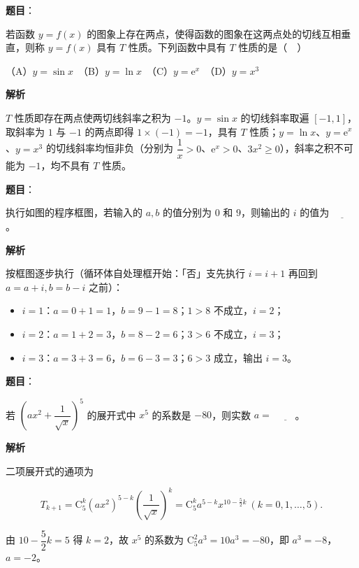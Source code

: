 \begin{answer}

\textbf{题目}：

若函数 \(y=f(x)\) 的图象上存在两点，使得函数的图象在这两点处的切线互相垂直，则称 \(y=f(x)\) 具有 \(T\) 性质。下列函数中具有 \(T\) 性质的是（　）

（A）\(y=\sin x\)　（B）\(y=\ln x\)　（C）\(y=\mathrm{e}^{x}\)　（D）\(y=x^{3}\)

\textbf{解析}

\(T\) 性质即存在两点使两切线斜率之积为 \(-1\)。\(y=\sin x\) 的切线斜率取遍 \([-1,1]\)，取斜率为 \(1\) 与 \(-1\) 的两点即得 \(1\times(-1)=-1\)，具有 \(T\) 性质；\(y=\ln x\)、\(y=\mathrm{e}^{x}\)、\(y=x^{3}\) 的切线斜率均恒非负（分别为 \(\dfrac{1}{x}>0\)、\(\mathrm{e}^{x}>0\)、\(3x^{2}\geqslant 0\)），斜率之积不可能为 \(-1\)，均不具有 \(T\) 性质。


\end{answer}
\begin{answer}

\textbf{题目}：

执行如图的程序框图，若输入的 \(a,b\) 的值分别为 \(0\) 和 \(9\)，则输出的 \(i\) 的值为 \(\underline{\qquad}\)。
\nopagebreak[4]
\begin{center}\end{center}
\nopagebreak[4]
\textbf{解析}

按框图逐步执行（循环体自处理框开始：「否」支先执行 \(i=i+1\) 再回到 \(a=a+i,b=b-i\) 之前）：

\begin{itemize}
\item \(i=1\)：\(a=0+1=1\)，\(b=9-1=8\)；\(1>8\) 不成立，\(i=2\)；
\item \(i=2\)：\(a=1+2=3\)，\(b=8-2=6\)；\(3>6\) 不成立，\(i=3\)；
\item \(i=3\)：\(a=3+3=6\)，\(b=6-3=3\)；\(6>3\) 成立，输出 \(i=3\)。
\end{itemize}


\end{answer}
\begin{answer}

\textbf{题目}：

若 \(\left(ax^{2}+\dfrac{1}{\sqrt{x}}\right)^{5}\) 的展开式中 \(x^{5}\) 的系数是 \(-80\)，则实数 \(a=\) \(\underline{\qquad}\)。

\textbf{解析}

二项展开式的通项为

\nopagebreak[4]
\[
T_{k+1}=\mathrm{C}_{5}^{k}\left(ax^{2}\right)^{5-k}\left(\dfrac{1}{\sqrt{x}}\right)^{k}=\mathrm{C}_{5}^{k}a^{5-k}x^{10-\frac{5}{2}k}\ (k=0,1,\dots,5).
\]

由 \(10-\dfrac{5}{2}k=5\) 得 \(k=2\)，故 \(x^{5}\) 的系数为 \(\mathrm{C}_{5}^{2}a^{3}=10a^{3}=-80\)，即 \(a^{3}=-8\)，\(a=-2\)。


\end{answer}
